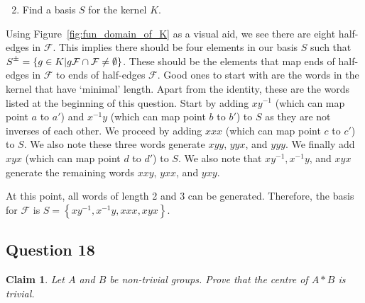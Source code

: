 \documentclass[12pt]{article}%
\newtheorem*{claim*}{Claim}
\newcommand{\rpm}{\raisebox{.2ex}{$\scriptstyle\pm$}}
\begin{document}
\begin{enumerate}
  \setcounter{enumi}{1}
  \item Find a basis $S$ for the kernel $K$.
\end{enumerate}

Using Figure~\ref{fig:fun_domain_of_K} as a visual aid, we see there are eight half-edges in
$\mathcal{F}$. This implies there should be four elements in our basis $S$ such that $S^{\rpm}=\left\{g\in
K | g\mathcal{F} \cap \mathcal{F} \neq \emptyset \right\}$. These should be the elements that map ends of
half-edges in $\mathcal{F}$ to ends of half-edges $\mathcal{F}$.  Good ones to start with are the words in
the kernel that have `minimal' length. Apart from the identity, these are the words listed at the
beginning of this question. Start by adding $xy^{-1}$ (which can map point $a$ to $a'$) and $x^{-1}y$
(which can map point $b$ to $b'$) to $S$ as they are not inverses of each other. We proceed by adding
$xxx$ (which can map point $c$ to $c'$) to $S$. We also note these three words generate $xyy$, $yyx$,
and $yyy$. We finally add $xyx$ (which can map point $d$ to $d'$) to $S$. We also note that $xy^{-1},
x^{-1}y$, and $xyx$ generate the remaining words $xxy$, $yxx$, and $yxy$.

At this point, all words of length 2 and 3 can be generated. Therefore, the basis for $\mathcal{F}$ is
$S=\left\{xy^{-1}, x^{-1}y, xxx, xyx\right\}$.

\subsection*{Question 18}

\begin{claim*}
Let $A$ and $B$ be non-trivial groups. Prove that the centre of $A*B$ is trivial.
\end{claim*}
\end{document}
